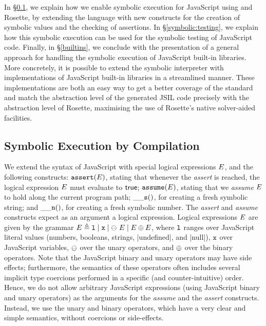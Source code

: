 In \S\ref{symb:exec:comp}, we explain how we enable symbolic execution for JavaScript using \JSComp and Rosette, by extending the language with new constructs for the creation of symbolic values and the checking of assertions.
In \S\ref{symbolic:testing}, we explain how this symbolic execution can be used for the symbolic testing of JavaScript code. 
Finally, in \S\ref{builtins}, we conclude with the presentation 
of a general approach for handling the symbolic execution of JavaScript built-in libraries.
More concretely, it is possible to extend the \jsil symbolic interpreter with \rosette implementations of JavaScript built-in libraries in a streamlined manner.  
These implementations are both an easy way to get a better coverage of the standard and 
match the abstraction level of the generated JSIL code precisely with the abstraction level 
of Rosette, maximising the use of Rosette's native solver-aided facilities.


\subsection{Symbolic Execution by Compilation} 
\label{symb:exec:comp}

We extend the syntax of JavaScript with special logical expressions $E$, 
and the following constructs: %
 $\mathtt{assert}(E)$, stating that whenever the \emph{assert} is reached, 
the logical expression $E$ must evaluate to ${\sf true}$; 
 $\mathtt{assume}(E)$, stating that we \emph{assume} $E$ to hold along the
current program path; 
 $\_\_{\mathtt{s}}()$, for creating a fresh symbolic string; and
 $\_\_{\mathtt{n}}()$, for creating a fresh symbolic number. 
The \emph{assert} and \emph{assume} constructs expect as an argument 
a logical expression. 
Logical expressions $E$ are given by the grammar 
$E \triangleq \mathtt{l} \mid \mathtt{x} \mid \ominus\ E \mid E \oplus E$, 
where $\mathtt{l}$ ranges over JavaScript literal values (numbers, booleans, strings, \jsinline|undefined|, and \jsinline|null|), $\mathtt{x}$ over JavaScript variables, 
$\ominus$ over the \jsil unary operators, and $\oplus$ over the \jsil binary operators.
Note that the JavaScript binary and unary operators may have side effects; furthermore,  
the semantics of these operators often includes several implicit type coercions 
performed in a specific (and counter-intuitive) order. 
Hence, we do not allow arbitrary JavaScript expressions (using JavaScript 
binary and unary operators) as the arguments for the \emph{assume} and 
the \emph{assert} constructs. Instead, we use the \jsil unary and binary operators, which have a very clear and simple semantics, without coercions or side-effects.

